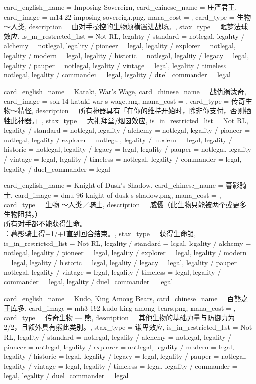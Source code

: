 \documentclass[lang = cn, color = black, 10pt]{AllThatStax}
\begin{document}
\card
{
	card_english_name = {Imposing Sovereign},
	card_chinese_name = {庄严君王},
	card_image = m14-22-imposing-sovereign.png,
	mana_cost = ,
	card_type = 生物～人类,
	description = {由对手操控的生物须横置进战场。},
	stax_type = 眠梦法球效应,
	is_in_restricted_list = Not RL,
	legality / standard = notlegal,
	legality / alchemy = notlegal,
	legality / pioneer = legal,
	legality / explorer = notlegal,
	legality / modern = legal,
	legality / historic = notlegal,
	legality / legacy = legal,
	legality / pauper = notlegal,
	legality / vintage = legal,
	legality / timeless = notlegal,
	legality / commander = legal,
	legality / duel_commander = legal
}

\card
{
	card_english_name = {Kataki, War's Wage},
	card_chinese_name = {战仇祸汰奇},
	card_image = sok-14-kataki-war-s-wage.png,
	mana_cost = ,
	card_type = 传奇生物～精怪,
	description = {所有神器具有「在你的维持开始时，除非你支付，否则牺牲此神器。」},
	stax_type = 大礼拜堂/烟囱效应,
	is_in_restricted_list = Not RL,
	legality / standard = notlegal,
	legality / alchemy = notlegal,
	legality / pioneer = notlegal,
	legality / explorer = notlegal,
	legality / modern = legal,
	legality / historic = notlegal,
	legality / legacy = legal,
	legality / pauper = notlegal,
	legality / vintage = legal,
	legality / timeless = notlegal,
	legality / commander = legal,
	legality / duel_commander = legal
}

\card
{
	card_english_name = {Knight of Dusk's Shadow},
	card_chinese_name = {暮影骑士},
	card_image = dmu-96-knight-of-dusk-s-shadow.png,
	mana_cost = ,
	card_type = 生物 ～人类／骑士,
	description = {威慑（此生物只能被两个或更多生物阻挡。）\\
		所有对手都不能获得生命。\\
		：暮影骑士得+1/+1直到回合结束。},
	stax_type = 获得生命锁,
	is_in_restricted_list = Not RL,
	legality / standard = legal,
	legality / alchemy = notlegal,
	legality / pioneer = legal,
	legality / explorer = legal,
	legality / modern = legal,
	legality / historic = legal,
	legality / legacy = legal,
	legality / pauper = notlegal,
	legality / vintage = legal,
	legality / timeless = legal,
	legality / commander = legal,
	legality / duel_commander = legal
}

\card
{
	card_english_name = {Kudo, King Among Bears},
	card_chinese_name = {百熊之王库多},
	card_image = mh3-192-kudo-king-among-bears.png,
	mana_cost = ,
	card_type = 传奇生物 — 熊,
	description = {其他生物的基础力量与防御力为2/2，且额外具有熊此类别。},
	stax_type = 谦卑效应,
	is_in_restricted_list = Not RL,
	legality / standard = notlegal,
	legality / alchemy = notlegal,
	legality / pioneer = notlegal,
	legality / explorer = notlegal,
	legality / modern = legal,
	legality / historic = legal,
	legality / legacy = legal,
	legality / pauper = notlegal,
	legality / vintage = legal,
	legality / timeless = legal,
	legality / commander = legal,
	legality / duel_commander = legal
}
\end{document}
